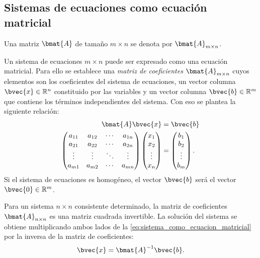 \documentclass{fmbnotes}
\begin{document}
\subsection[Sistemas de ecuaciones como ecuación matricial]{Sistemas de ecuaciones como ecuación matricial}

\begin{notacion}
	Una matriz \(\bmat{A}\) de tamaño \(m \times n\) se denota por \(\bmat{A}_{m\times n}\).
	\label{not:tamano_matriz}
\end{notacion}

Un sistema de ecuaciones \(m \times n\) puede ser expresado como una ecuación matricial. Para ello se establece una \emph{matriz de coeficientes} \(\bmat{A}_{m\times n}\) cuyos elementos son los coeficientes del sistema de ecuaciones, un vector columna \(\bvec{x} \in \mathbb{R}^{n}\) constituido por las variables y un vector columna \(\bvec{b} \in \mathbb{R}^{m}\) que contiene los términos independientes del sistema. Con eso se plantea la siguiente relación: 
\begin{align}
\begin{split}
\bmat{A}\bvec{x} &= \bvec{b} \\
\begin{pmatrix}
a_{11} & a_{12} & \cdots & a_{1n} \\
a_{21} & a_{22} & \cdots & a_{2n} \\
\vdots & \vdots & \ddots & \vdots \\
a_{m1} & a_{m2} & \cdots & a_{mn} 
\end{pmatrix}\begin{pmatrix}
x_1 \\ x_2 \\ \vdots \\ x_n
\end{pmatrix} & =\begin{pmatrix}
b_1 \\ b_2 \\ \vdots \\ b_m
\end{pmatrix}.
\label{eq:sistema_como_ecuacion_matricial}
\end{split}
\end{align}
Si el sistema de ecuaciones es homogéneo, el vector \(\bvec{b}\) será el vector \(\bvec{0} \in \mathbb{R}^{m}\). 

Para un sistema \(n \times n\) consistente determinado, la matriz de coeficientes \(\bmat{A}_{n \times n}\) es una matriz cuadrada invertible. La solución del sistema se obtiene multiplicando ambos lados de la \autoref{eq:sistema_como_ecuacion_matricial} por la inversa de la matriz de coeficientes:
\begin{equation*}
\bvec{x}=\bmat{A}^{-1}\bvec{b}.
\end{equation*}
\end{document}
